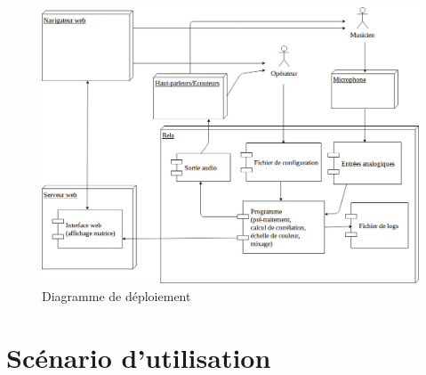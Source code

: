 \documentclass{article}
\begin{document}
\begin{figure}[h]
 \caption{\label{diag_deploiement}Diagramme de déploiement}
 \centering
 \includegraphics[scale=0.30]{diag_deploiement.jpg}
\end{figure}
\section{Scénario d'utilisation}
\end{document}
